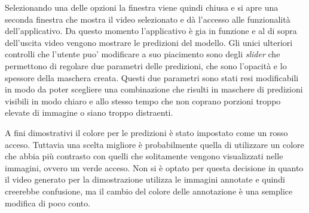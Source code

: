 Selezionando una delle opzioni la finestra viene quindi chiusa
e si apre una seconda finestra che mostra il video selezionato
e dà l'accesso alle funzionalità dell'applicativo.
Da questo momento l'applicativo è gia in funzione
e al di sopra dell'uscita video vengono mostrare le predizioni
del modello.
Gli unici ulteriori controlli che l'utente puo' modificare a
suo piacimento sono degli {\it slider} che permettono di
regolare due parametri delle predizioni, che sono
l'opacità e lo spessore della maschera creata.
Questi due parametri sono stati resi modificabili in modo
da poter scegliere una combinazione che risulti
in maschere di predizioni visibili in modo chiaro e allo
stesso tempo che non coprano porzioni troppo elevate di
immagine o siano troppo distraenti.

A fini dimostrativi il colore per le predizioni è stato 
impostato  come un rosso acceso.
Tuttavia una scelta migliore è probabilmente quella di
utilizzare un colore che abbia più contrasto con quelli
che solitamente vengono visualizzati nelle immagini,
ovvero un verde acceso.
Non si è optato per questa decisione in quanto il video
generato per la dimostrazione utilizza le immagini
annotate e quindi creerebbe confusione, ma il cambio
del colore delle annotazione è una semplice modifica
di poco conto.
